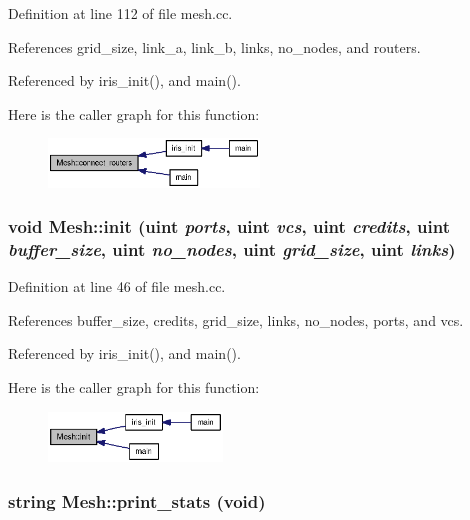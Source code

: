 Definition at line 112 of file mesh.cc.

References grid\_\-size, link\_\-a, link\_\-b, links, no\_\-nodes, and routers.

Referenced by iris\_\-init(), and main().

Here is the caller graph for this function:\nopagebreak
\begin{figure}[H]
\begin{center}
\leavevmode
\includegraphics[width=159pt]{classMesh_fea2e233774ea469b02cff87afc336bc_icgraph}
\end{center}
\end{figure}
\subsubsection[{init}]{\setlength{\rightskip}{0pt plus 5cm}void Mesh::init ({\bf uint} {\em ports}, \/  {\bf uint} {\em vcs}, \/  {\bf uint} {\em credits}, \/  {\bf uint} {\em buffer\_\-size}, \/  {\bf uint} {\em no\_\-nodes}, \/  {\bf uint} {\em grid\_\-size}, \/  {\bf uint} {\em links})}\label{classMesh_678dc93df5115714b2d2e9a5932692db}




Definition at line 46 of file mesh.cc.

References buffer\_\-size, credits, grid\_\-size, links, no\_\-nodes, ports, and vcs.

Referenced by iris\_\-init(), and main().

Here is the caller graph for this function:\nopagebreak
\begin{figure}[H]
\begin{center}
\leavevmode
\includegraphics[width=131pt]{classMesh_678dc93df5115714b2d2e9a5932692db_icgraph}
\end{center}
\end{figure}
\subsubsection[{print\_\-stats}]{\setlength{\rightskip}{0pt plus 5cm}string Mesh::print\_\-stats (void)}\label{classMesh_eea84429f858784c6232e5633603fdf8}




